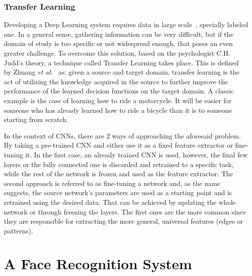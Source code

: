 \documentclass[class=report, crop=false, a4paper, 12pt]{standalone}
\begin{document}
\subsubsection{Transfer Learning} %
\par Developing a Deep Learning system requires data in large scale~\autocite{parkhiDeepFaceRecognition2015}, specially labeled one. In a general sense, gathering information can be very difficult, but if the domain of study is too specific or not widespread enough, that poses an even greater challenge. To overcome this solution, based on the psychologist C.H. Judd's theory, a technique called Transfer Learning takes place. This is defined by Zhuang \textit{et al.}~\autocite{zhuangComprehensiveSurveyTransfer2020} as: given a source and target domain, transfer learning is the act of utilizing the knowledge acquired in the source to further improve the performance of the learned decision functions on the target domain. A classic example is the case of learning how to ride a motorcycle. It will be easier for someone who has already learned how to ride a bicycle than it is to someone starting from scratch.
\par In the context of CNNs, there are 2 ways of approaching the aforesaid problem. By taking a pre-trained CNN and either use it as a fixed feature extractor or fine-tuning it. In the first case, an already trained CNN is used, however, the final few layers or the fully connected one is discarded and retrained to a specific task, while the rest of the network is frozen and used as the feature extractor. The second approach is referred to as fine-tuning a network and, as the name suggests, the source network's parameters are used as a starting point and is retrained using the desired data. That can be achieved by updating the whole network or through freezing the layers. The first ones are the more common since they are responsible for extracting the more general, universal features (edges or patterns).


\newpage
\section{A Face Recognition System}

\end{document}
